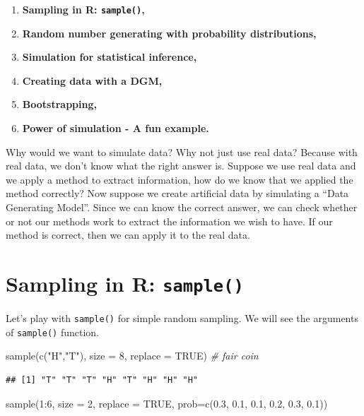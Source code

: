 \documentclass[
]{book}
\newenvironment{Shaded}{\begin{snugshade}}{\end{snugshade}}
\newcommand{\AttributeTok}[1]{\textcolor[rgb]{0.77,0.63,0.00}{#1}}
\newcommand{\CommentTok}[1]{\textcolor[rgb]{0.56,0.35,0.01}{\textit{#1}}}
\newcommand{\ConstantTok}[1]{\textcolor[rgb]{0.00,0.00,0.00}{#1}}
\newcommand{\DecValTok}[1]{\textcolor[rgb]{0.00,0.00,0.81}{#1}}
\newcommand{\FloatTok}[1]{\textcolor[rgb]{0.00,0.00,0.81}{#1}}
\newcommand{\FunctionTok}[1]{\textcolor[rgb]{0.00,0.00,0.00}{#1}}
\newcommand{\NormalTok}[1]{#1}
\newcommand{\SpecialCharTok}[1]{\textcolor[rgb]{0.00,0.00,0.00}{#1}}
\newcommand{\StringTok}[1]{\textcolor[rgb]{0.31,0.60,0.02}{#1}}
\providecommand{\tightlist}{%
  \setlength{\itemsep}{0pt}\setlength{\parskip}{0pt}}
\begin{document}
\begin{enumerate}
\def\labelenumi{\arabic{enumi}.}
\tightlist
\item
  \textbf{Sampling in R: \texttt{sample()},}
\item
  \textbf{Random number generating with probability distributions,}
\item
  \textbf{Simulation for statistical inference,}
\item
  \textbf{Creating data with a DGM,}
\item
  \textbf{Bootstrapping,}
\item
  \textbf{Power of simulation - A fun example.}
\end{enumerate}

Why would we want to simulate data? Why not just use real data? Because with real data, we don't know what the right answer is. Suppose we use real data and we apply a method to extract information, how do we know that we applied the method correctly? Now suppose we create artificial data by simulating a ``Data Generating Model''. Since we can know the correct answer, we can check whether or not our methods work to extract the information we wish to have. If our method is correct, then we can apply it to the real data.

\hypertarget{sampling-in-r-sample}{%
\section{\texorpdfstring{Sampling in R: \texttt{sample()}}{Sampling in R: sample()}}\label{sampling-in-r-sample}}

Let's play with \texttt{sample()} for simple random sampling. We will see the arguments of \texttt{sample()} function.

\begin{Shaded}
\begin{Highlighting}[]
\FunctionTok{sample}\NormalTok{(}\FunctionTok{c}\NormalTok{(}\StringTok{"H"}\NormalTok{,}\StringTok{"T"}\NormalTok{), }\AttributeTok{size =} \DecValTok{8}\NormalTok{, }\AttributeTok{replace =} \ConstantTok{TRUE}\NormalTok{)  }\CommentTok{\# fair coin}
\end{Highlighting}
\end{Shaded}

\begin{verbatim}
## [1] "T" "T" "T" "H" "T" "H" "H" "H"
\end{verbatim}

\begin{Shaded}
\begin{Highlighting}[]
\FunctionTok{sample}\NormalTok{(}\DecValTok{1}\SpecialCharTok{:}\DecValTok{6}\NormalTok{, }\AttributeTok{size =} \DecValTok{2}\NormalTok{, }\AttributeTok{replace =} \ConstantTok{TRUE}\NormalTok{, }\AttributeTok{prob=}\FunctionTok{c}\NormalTok{(}\FloatTok{0.3}\NormalTok{, }\FloatTok{0.1}\NormalTok{, }\FloatTok{0.1}\NormalTok{, }\FloatTok{0.2}\NormalTok{, }\FloatTok{0.3}\NormalTok{, }\FloatTok{0.1}\NormalTok{))}
\end{Highlighting}
\end{Shaded}
\end{document}
